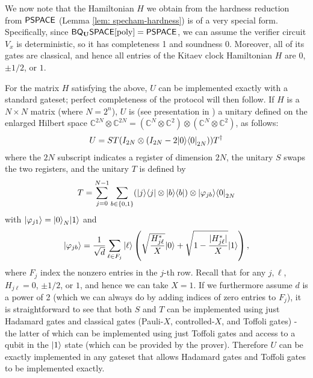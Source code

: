 \documentclass[a4paper,UKenglish]{lipics-v2016}
\newcommand\PSPACE{{\sf{PSPACE}}}
\newcommand{\classfont}{\sf}
\newcommand{\Unitary}{\mathbf{U}}
\newcommand{\unitaryBQSPACE}[1]{{\classfont{BQ}_\Unitary\classfont{SPACE}}[#1]}
\DeclareMathOperator{\poly}{poly}
\begin{document}
We now note that the Hamiltonian $H$ we obtain from the hardness reduction from $\PSPACE$ (Lemma \ref{lem: specham-hardness}) is of a very special form. Specifically, since $\unitaryBQSPACE{\poly}=\PSPACE$, we can assume the verifier circuit $V_x$ is deterministic, so it has completeness 1 and soundness 0. Moreover, all of its gates are classical, and hence all entries of the Kitaev clock Hamiltonian $H$ are $0$, $\pm 1/2$, or $1$.

For the matrix $H$ satisfying the above, $U$ can be implemented exactly with a standard gateset; perfect completeness of the protocol will then follow. If $H$ is a $N \times N$ matrix (where $N=2^n$), $U$ is (see presentation in \cite[Section~3.1~and~Lemma~10]{berry15}) a unitary defined on the enlarged Hilbert space $\mathbb{C}^{2N} \otimes \mathbb{C}^{2N} = (\mathbb{C}^{N} \otimes \mathbb{C}^2) \otimes  (\mathbb{C}^{N} \otimes \mathbb{C}^2)$, as follows:
\begin{equation}
U = ST(I_{2N} \otimes (I_{2N} - 2{\left\vert{0}\right\rangle}{\left\langle{0}\right\vert}_{2N})) T^\dagger
\end{equation}
where the $2N$ subscript indicates a register of dimension $2N$, the unitary $S$ swaps the two registers, and the unitary $T$ is defined by
\begin{equation}
T = \sum_{j=0}^{N-1}\sum_{b \in \{0,1\}} ({\left\vert{j}\right\rangle}{\left\langle{j}\right\vert} \otimes {\left\vert{b}\right\rangle}{\left\langle{b}\right\vert}) \otimes {\left\vert{\varphi_{jb}}\right\rangle}{\left\langle{0}\right\vert}_{2N}
\end{equation}
with ${\left\vert{\varphi_{j1}}\right\rangle} = {\left\vert{0}\right\rangle}_N{\left\vert{1}\right\rangle}$ and
\begin{equation}
{\left\vert{\varphi_{jb}}\right\rangle} = \frac{1}{\sqrt{d}} \sum_{\ell \in F_j} {\left\vert{\ell}\right\rangle}\left(\sqrt{\frac{H^*_{j\ell}}{X}}{\left\vert{0}\right\rangle} + \sqrt{1-\frac{|H^*_{j\ell}|}{X}}{\left\vert{1}\right\rangle}\right),
\end{equation}
where $F_j$ index the nonzero entries in the $j$-th row. Recall that for any $j,\ell$, $H_{j\ell}=0$, $\pm 1/2$, or $1$, and hence we can take $X=1$. If we furthermore assume $d$ is a power of 2 (which we can always do by adding indices of zero entries to $F_j$), it is straightforward to see that both $S$ and $T$ can be implemented using just Hadamard gates and classical gates (Pauli-$X$, controlled-$X$, and Toffoli gates) - the latter of which can be implemented using just Toffoli gates and access to a qubit in the ${\left\vert{1}\right\rangle}$ state (which can be provided by the prover). Therefore $U$ can be exactly implemented in any gateset that allows Hadamard gates and Toffoli gates to be implemented exactly.
\end{document}
